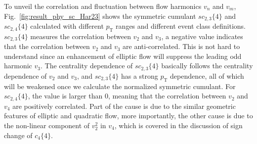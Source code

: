 To unveil the correlation and fluctuation between flow harmonics $v_n$ and $v_m$, Fig.~\ref{fig:result_phy_sc_Har23} shows the symmetric cumulant $sc_{2,3}\{4\}$ and $sc_{2,4}\{4\}$ calculated with different $p_\text{T}$ ranges and different event class definitions. $sc_{2,3}\{4\}$ measures the correlation between $v_2$ and $v_3$, a negative value indicates that the correlation between $v_2$ and $v_3$ are anti-correlated. This is not hard to understand since an enhancement of elliptic flow will suppress the leading odd harmonic $v_3$. The centrality dependence of $sc_{2,3}\{4\}$ basically follows the centrality dependence of $v_2$ and $v_3$, and $sc_{2,3}\{4\}$ has a strong $p_\text{T}$ dependence, all of which will be weakened once we calculate the normalized symmetric cumulant. For $sc_{2,4}\{4\}$, the value is larger than 0, meaning that the correlation between $v_2$ and $v_4$ are positively correlated. Part of the cause is due to the similar geometric features of elliptic and quadratic flow, more importantly, the other cause is due to the non-linear component of $v_2^2$ in $v_4$, which is covered in the discussion of sign change of $c_4\{4\}$. 

